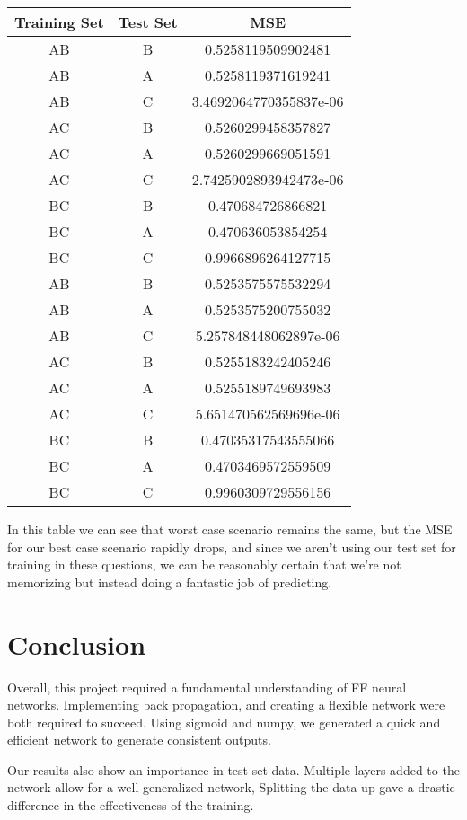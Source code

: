 \documentclass[12pt]{article}
\begin{document}
\begin{tabular}{|c|c|c|}
\hline
Training Set & Test Set & MSE \\
\hline
AB & B & 0.5258119509902481 \\
AB & A & 0.5258119371619241 \\
AB & C & 3.4692064770355837e-06 \\
\hline
AC & B & 0.5260299458357827 \\
AC & A & 0.5260299669051591 \\
AC & C & 2.7425902893942473e-06 \\
\hline
BC & B & 0.470684726866821 \\
BC & A & 0.470636053854254 \\
BC & C & 0.9966896264127715 \\
\hline
AB & B & 0.5253575575532294 \\
AB & A & 0.5253575200755032 \\
AB & C & 5.257848448062897e-06 \\
\hline
AC & B & 0.5255183242405246 \\
AC & A & 0.5255189749693983 \\
AC & C & 5.651470562569696e-06 \\
\hline
BC & B & 0.47035317543555066 \\
BC & A & 0.4703469572559509 \\
BC & C & 0.9960309729556156 \\
\hline
\end{tabular}

In this table we can see that worst case scenario remains the same, but the MSE for our best case scenario rapidly drops, and since we aren't using our test set for training in these questions, we can be reasonably certain that we're not memorizing but instead doing a fantastic job of predicting. 


\section{Conclusion}
Overall, this project required a fundamental understanding of FF neural networks. Implementing back propagation, and creating a flexible network were both required to succeed. Using sigmoid and numpy, we generated a quick and efficient network to generate consistent outputs. 

Our results also show an importance in test set data. Multiple layers added to the network allow for a well generalized network, Splitting the data up gave a drastic difference in the effectiveness of the training. 
\end{document}
